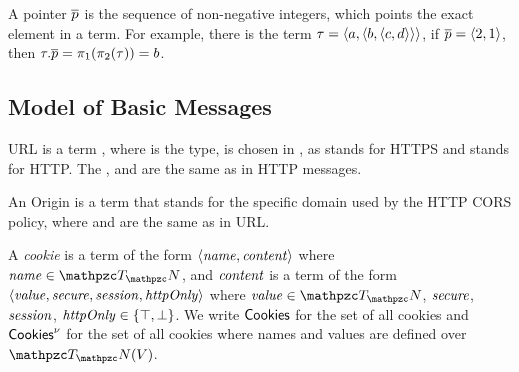 \begin{definition}[Pointer]
A pointer $\overline{p}$ is the sequence of non-negative integers, which points the exact element in a term. For example, there is the term $\tau=\langle a, \langle b, \langle c, d\rangle\rangle\rangle$, if $\overline{p}=\langle2,1\rangle$, then $\tau.\overline{p} = \pi_1(\pi_2(\tau)) = b$.
\end{definition}


\subsection{Model of Basic Messages}

\begin{definition}[URLs]
URL is a term , where  is the type,  is chosen in ,  as  stands for HTTPS and  stands for HTTP. The , and  are the same as in HTTP messages.
\end{definition}

\begin{definition}[Origins]
An Origin is a term  that stands for the specific domain used by the HTTP CORS policy, where  and  are the same as in URL.
\end{definition}

\begin{definition}[Cookies]
A \emph{cookie} is a term of the form
  $\langle\mathit{name}, \mathit{content}\rangle$ where $\mi{name} \in
  \terms$, and $\mathit{content}$ is a term of the form
  $\langle\mathit{value}, \mathit{secure}, \mathit{session},
    \mathit{httpOnly}\rangle$ where $\mi{value} \in \terms$,
  $\mathit{secure}$, $\mathit{session}$, $\mathit{httpOnly} \in
  \{\top, \bot\}$. We write $\mathsf{Cookies}$ for the set of all
  cookies and $\mathsf{Cookies}^\nu$ for the set of all cookies
  where names and values are defined over $\terms(V)$.
\end{definition}

